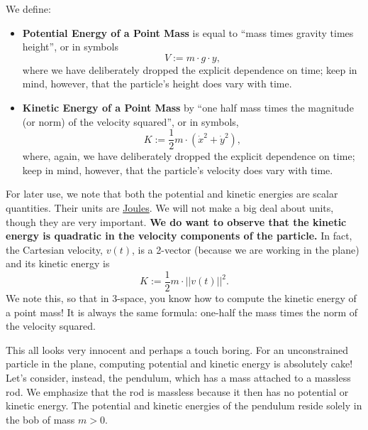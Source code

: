 We define:
\begin{itemize}
    \item \textbf{Potential Energy of a Point Mass} is equal to ``mass times gravity times height'', or in symbols
    $$V:= m \cdot g \cdot y,$$
    where we have deliberately dropped the explicit dependence on time; keep in mind, however, that the particle's height does vary with time.

    \item \textbf{Kinetic Energy of a Point Mass} by ``one half mass times the magnitude (or norm) of the velocity squared'', or in symbols,
    \begin{equation}
    \label{eq:KEpointMassNoConstraints}
        K:= \frac{1}{2} m \cdot\left( \dot{x}^2  +  \dot{y}^2 \right),
    \end{equation}
     where, again, we have deliberately dropped the explicit dependence on time; keep in mind, however, that the particle's velocity does vary with time.
\end{itemize}
For later use, we note that both the potential and kinetic energies are scalar quantities. Their units are \href{https://en.wikipedia.org/wiki/Joule}{Joules}. We will not make a big deal about units, though they are very important. \textbf{We do want to observe that the kinetic energy is quadratic in the velocity components of the particle.} In fact, the Cartesian velocity, $v(t)$, is a 2-vector (because we are working in the plane) and its kinetic energy is $$K:=\frac{1}{2} m \cdot ||v(t)||^2.$$ 
We note this, so that in 3-space, you know how to compute the kinetic energy of a point mass! It is always the same formula: one-half the mass times the norm of the velocity squared.

This all looks very innocent and perhaps a touch boring. For an unconstrained particle in the plane, computing potential and kinetic energy is absolutely cake! Let's consider, instead, the pendulum, which has a mass attached to a massless rod. We emphasize that the rod is massless because it then has no potential or kinetic energy. The potential and kinetic energies of the pendulum reside solely in the bob of mass $m>0$.

